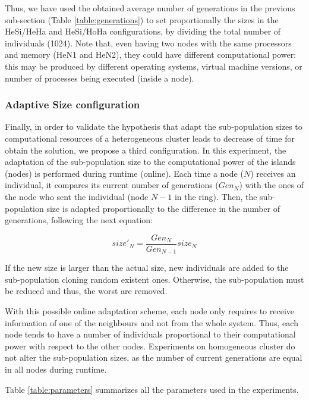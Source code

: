 \documentclass[final,1p,times]{elsarticle}
\begin{document}
Thus, we have used the obtained average number of generations in the previous sub-section (Table \ref{table:generations}) to set proportionally the sizes in the HeSi/HeHa and HeSi/HoHa configurations, by dividing the total number of individuals (1024). Note that, even having two nodes with the same processors and memory (HeN1 and HeN2), they could have different computational power: this may be produced by different operating systems, virtual machine versions, or number of processes being executed (inside a node).



\subsubsection{Adaptive Size configuration}

Finally, in order to validate the hypothesis that adapt the sub-population sizes to computational resources of a heterogeneous cluster leads to decrease of time for obtain the solution, we propose a third configuration. In this experiment, the adaptation of the sub-population size to the computational power of the islands (nodes) is performed during runtime (online).  Each time a node ($N$) receives an individual, it compares its current number of generations ($Gen_{N}$) with the ones of the node who sent the individual (node $N-1$ in the ring). Then, the sub-population size is adapted proportionally to the difference in the number of generations, following the next equation:

\begin{equation}
size'_{N}=\dfrac{Gen_{N}}{Gen_{N-1}}size_{N}
\end{equation}

If the new size is larger than the actual size, new individuals are added to the sub-population cloning random existent ones. Otherwise, the sub-population must be reduced and thus, the worst are removed.

With this possible online adaptation scheme, each node only requires to receive information of one of the neighbours and not from the whole system. Thus, each node tends to have a number of individuals proportional to their computational power with respect to the other nodes. Experiments on homogeneous cluster do not alter the sub-population sizes, as the number of current generations are equal in all nodes during runtime.

Table \ref{table:parameters} summarizes all the parameters used in the experiments.
\end{document}
